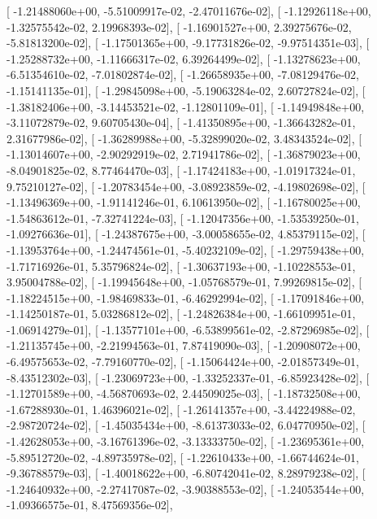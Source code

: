 \documentclass{article}
\begin{document}
       [ -1.21488060e+00,  -5.51009917e-02,  -2.47011676e-02],
       [ -1.12926118e+00,  -1.32575542e-02,   2.19968393e-02],
       [ -1.16901527e+00,   2.39275676e-02,  -5.81813200e-02],
       [ -1.17501365e+00,  -9.17731826e-02,  -9.97514351e-03],
       [ -1.25288732e+00,  -1.11666317e-02,   6.39264499e-02],
       [ -1.13278623e+00,  -6.51354610e-02,  -7.01802874e-02],
       [ -1.26658935e+00,  -7.08129476e-02,  -1.15141135e-01],
       [ -1.29845098e+00,  -5.19063284e-02,   2.60727824e-02],
       [ -1.38182406e+00,  -3.14453521e-02,  -1.12801109e-01],
       [ -1.14949848e+00,  -3.11072879e-02,   9.60705430e-04],
       [ -1.41350895e+00,  -1.36643282e-01,   2.31677986e-02],
       [ -1.36289988e+00,  -5.32899020e-02,   3.48343524e-02],
       [ -1.13014607e+00,  -2.90292919e-02,   2.71941786e-02],
       [ -1.36879023e+00,  -8.04901825e-02,   8.77464470e-03],
       [ -1.17424183e+00,  -1.01917324e-01,   9.75210127e-02],
       [ -1.20783454e+00,  -3.08923859e-02,  -4.19802698e-02],
       [ -1.13496369e+00,  -1.91141246e-01,   6.10613950e-02],
       [ -1.16780025e+00,  -1.54863612e-01,  -7.32741224e-03],
       [ -1.12047356e+00,  -1.53539250e-01,  -1.09276636e-01],
       [ -1.24387675e+00,  -3.00058655e-02,   4.85379115e-02],
       [ -1.13953764e+00,  -1.24474561e-01,  -5.40232109e-02],
       [ -1.29759438e+00,  -1.71716926e-01,   5.35796824e-02],
       [ -1.30637193e+00,  -1.10228553e-01,   3.95004788e-02],
       [ -1.19945648e+00,  -1.05768579e-01,   7.99269815e-02],
       [ -1.18224515e+00,  -1.98469833e-01,  -6.46292994e-02],
       [ -1.17091846e+00,  -1.14250187e-01,   5.03286812e-02],
       [ -1.24826384e+00,  -1.66109951e-01,  -1.06914279e-01],
       [ -1.13577101e+00,  -6.53899561e-02,  -2.87296985e-02],
       [ -1.21135745e+00,  -2.21994563e-01,   7.87419090e-03],
       [ -1.20908072e+00,  -6.49575653e-02,  -7.79160770e-02],
       [ -1.15064424e+00,  -2.01857349e-01,  -8.43512302e-03],
       [ -1.23069723e+00,  -1.33252337e-01,  -6.85923428e-02],
       [ -1.12701589e+00,  -4.56870693e-02,   2.44509025e-03],
       [ -1.18732508e+00,  -1.67288930e-01,   1.46396021e-02],
       [ -1.26141357e+00,  -3.44224988e-02,  -2.98720724e-02],
       [ -1.45035434e+00,  -8.61373033e-02,   6.04770950e-02],
       [ -1.42628053e+00,  -3.16761396e-02,  -3.13333750e-02],
       [ -1.23695361e+00,  -5.89512720e-02,  -4.89735978e-02],
       [ -1.22610433e+00,  -1.66744624e-01,  -9.36788579e-03],
       [ -1.40018622e+00,  -6.80742041e-02,   8.28979238e-02],
       [ -1.24640932e+00,  -2.27417087e-02,  -3.90388553e-02],
       [ -1.24053544e+00,  -1.09366575e-01,   8.47569356e-02],
\end{document}
